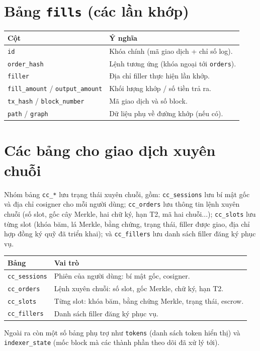 \documentclass[../DoAn.tex]{subfiles}
\begin{document}
\section{Bảng \texttt{fills} (các lần khớp)}

\begin{table}[H]
    \centering
    \begin{tabular}{|>{\raggedright\arraybackslash}p{5.5cm}|>{\raggedright\arraybackslash}p{8cm}|}
        \hline
        \textbf{Cột} & \textbf{Ý nghĩa} \\
        \hline
        \texttt{id} & Khóa chính (mã giao dịch + chỉ số log). \\
        \hline
        \texttt{order\_hash} & Lệnh tương ứng (khóa ngoại tới \texttt{orders}). \\
        \hline
        \texttt{filler} & Địa chỉ filler thực hiện lần khớp. \\
        \hline
        \texttt{fill\_amount} / \texttt{output\_amount} & Khối lượng khớp / số tiền trả ra. \\
        \hline
        \texttt{tx\_hash} / \texttt{block\_number} & Mã giao dịch và số block. \\
        \hline
        \texttt{path} / \texttt{graph} & Dữ liệu phụ về đường khớp (nếu có). \\
        \hline
    \end{tabular}
\end{table}

\section{Các bảng cho giao dịch xuyên chuỗi}

Nhóm bảng \texttt{cc\_*} lưu trạng thái xuyên chuỗi, gồm: \texttt{cc\_sessions} lưu bí mật gốc và địa chỉ cosigner cho mỗi người dùng; \texttt{cc\_orders} lưu thông tin lệnh xuyên chuỗi (số slot, gốc cây Merkle, hai chữ ký, hạn T2, mã hai chuỗi...); \texttt{cc\_slots} lưu từng slot (khóa băm, lá Merkle, bằng chứng, trạng thái, filler được giao, địa chỉ hợp đồng ký quỹ đã triển khai); và \texttt{cc\_fillers} lưu danh sách filler đăng ký phục vụ.

\begin{table}[H]
    \centering
    \begin{tabular}{|>{\raggedright\arraybackslash}p{5.5cm}|>{\raggedright\arraybackslash}p{8cm}|}
        \hline
        \textbf{Bảng} & \textbf{Vai trò} \\
        \hline
        \texttt{cc\_sessions} & Phiên của người dùng: bí mật gốc, cosigner. \\
        \hline
        \texttt{cc\_orders} & Lệnh xuyên chuỗi: số slot, gốc Merkle, chữ ký, hạn T2. \\
        \hline
        \texttt{cc\_slots} & Từng slot: khóa băm, bằng chứng Merkle, trạng thái, escrow. \\
        \hline
        \texttt{cc\_fillers} & Danh sách filler đăng ký phục vụ. \\
        \hline
    \end{tabular}
\end{table}

Ngoài ra còn một số bảng phụ trợ như \texttt{tokens} (danh sách token hiển thị) và \texttt{indexer\_state} (mốc block mà các thành phần theo dõi đã xử lý tới).
\end{document}

